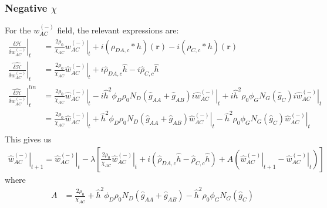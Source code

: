 \documentclass{article}
\begin{document}
    \subsubsection{Negative $\chi$}
  For the $w_{AC}^{(-)}$ field, the relevant expressions are:
  \begin{align*}
    \left. \frac{\delta \mathcal{H}}{\delta w_{AC}^{(-)}} \right|_t &=
      \frac{2 \rho_0}{\chi_{AC}} \left. w_{AC}^{(-)} \right|_t
      +i (\rho_{DA,c} \ast h)(\mathbf{r})
      -i (\rho_{C,c} \ast h)(\mathbf{r}) \\
    \left. \hat{\frac{\delta \mathcal{H}}{\delta w_{AC}^{(-)}}} \right|_t &=
      \frac{2 \rho_0}{\chi_{AC}} \left. \hat{w}_{AC}^{(-)} \right|_t
      +i \hat{\rho}_{DA,c} \hat{h}
      -i \hat{\rho}_{C,c} \hat{h} \\
    \left.
      \hat{\frac{\delta \mathcal{H}}{\delta w_{AC}^{(-)}}}
    \right| ^{lin}_t &=
    \frac{2\rho_0}{\chi_{AC}} \left. \hat{w}_{AC}^{(-)} \right|_t
      - i \hat{h}^2 \phi_D \rho_0 N_D
        (\hat{g}_{AA} + \hat{g}_{AB}) i \left.
          \hat{w}_{AC}^{(-)} \right|_t 
          + i \hat{h} ^2  {\rho}_0  
          \left. \phi_G N_G (\hat{g}_{C}) i \hat{w}_{AC}^{(-)} \right|_t
          \\
    &= \frac{2\rho_0}{\chi_{AC}} \left. \hat{w}_{AC}^{(-)} \right|_t
      + \hat{h}^2 \phi_D \rho_0 N_D
        (\hat{g}_{AA} + \hat{g}_{AB})
          \left. \hat{w}_{AC}^{(-)} \right|_t
          -  \hat{h} ^2  {\rho}_0  
          \left. \phi_G N_G (\hat{g}_{C})  \hat{w}_{AC}^{(-)} \right|_t
          \\
  \end{align*}
  This gives us
  \begin{align*}
    \left. \hat{w}_{AC}^{(-)} \right|_{t+1} =
      \left. \hat{w}_{AC}^{(-)} \right|_t - \lambda \left[
        \frac{2\rho_0}{\chi_{AC}} \left. \hat{w}_{AC}^{(-)} \right|_t
        + i ( \hat{\rho}_{DA,c} \hat{h}
              - \hat{\rho}_{C,c} \hat{h} )
        + A ( \left. \hat{w}_{AC}^{(-)} \right|_{t+1}
              - \left. \hat{w}_{AC}^{(-)} \right|_t)
      \right]
  \end{align*}
  where
  \begin{align*}
    A &=
    \frac{2\rho_0}{\chi_{AC}} 
      + \hat{h}^2 \phi_D \rho_0 N_D
        (\hat{g}_{AA} + \hat{g}_{AB})
        -  \hat{h} ^2  {\rho}_0  
          \phi_G N_G (\hat{g}_{C}) 
  \end{align*}
\end{document}
